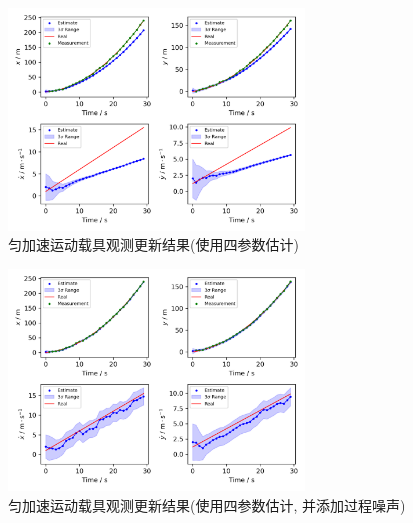 \documentclass[12pt]{article}
\begin{document}
\begin{figure}[htbp] %
   \centering
   \includegraphics[width=0.7\textwidth]{./figures/exp3_1} 
   \caption{匀加速运动载具观测更新结果(使用四参数估计)}
   \label{fig:exp3_1}
\end{figure} 

\begin{figure}[htbp] %
   \centering
   \includegraphics[width=0.7\textwidth]{./figures/exp3_2} 
   \caption{匀加速运动载具观测更新结果(使用四参数估计, 并添加过程噪声)}
   \label{fig:exp3_2}
\end{figure}
\end{document}
